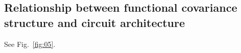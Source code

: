 \subsection*{Relationship between functional covariance structure and circuit architecture}

See Fig.~\ref{fig:05}.
